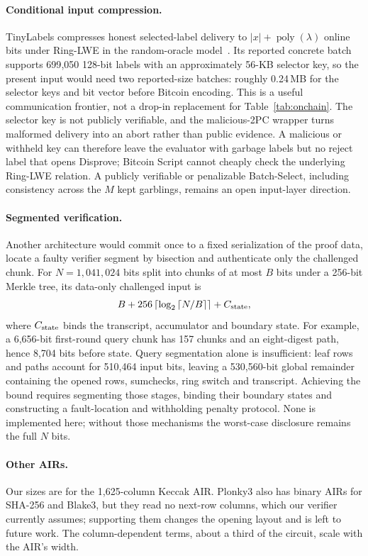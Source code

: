 \documentclass[11pt]{article}
\begin{document}
\paragraph{Conditional input compression.} TinyLabels compresses honest
selected-label delivery to $|x|+\operatorname{poly}(\lambda)$ online bits under
Ring-LWE in the random-oracle model~\cite{tinylabels24}. Its reported concrete
batch supports 699{,}050 128-bit labels with an approximately 56-KB selector
key, so the present input would need two reported-size batches: roughly
0.24\,MB for the selector keys and bit vector before Bitcoin encoding. This is
a useful communication frontier, not a drop-in replacement for Table~\ref{tab:onchain}.
The selector key is not publicly verifiable, and the malicious-2PC wrapper
turns malformed delivery into an abort rather than public evidence. A malicious
or withheld key can therefore leave the evaluator with garbage labels but no
reject label that opens \textsf{Disprove}; Bitcoin Script cannot cheaply check
the underlying Ring-LWE relation. A publicly verifiable or penalizable
Batch-Select, including consistency across the $M$ kept garblings, remains an
open input-layer direction.

\paragraph{Segmented verification.} Another architecture would commit once to
a fixed serialization of the proof data, locate a faulty verifier segment by
bisection and authenticate only the challenged chunk. For $N=1{,}041{,}024$
bits split into chunks of at most $B$ bits under a 256-bit Merkle tree, its
data-only challenged input is
\[
 B+256\left\lceil\log_2\left\lceil N/B\right\rceil\right\rceil+C_{\rm state},
\]
where $C_{\rm state}$ binds the transcript, accumulator and boundary state.
For example, a 6{,}656-bit first-round query chunk has 157 chunks and an
eight-digest path, hence 8{,}704 bits before state. Query segmentation alone is
insufficient: leaf rows and paths account for 510{,}464 input bits, leaving a
530{,}560-bit global remainder containing the opened rows, sumchecks, ring
switch and transcript. Achieving the bound requires segmenting those stages,
binding their boundary states and constructing a fault-location and withholding
penalty protocol. None is implemented here; without those mechanisms the
worst-case disclosure remains the full $N$ bits.

\paragraph{Other AIRs.} Our sizes are for the 1{,}625-column Keccak AIR. Plonky3
also has binary AIRs for SHA-256 and Blake3, but they read no next-row columns,
which our verifier currently assumes; supporting them changes the opening layout
and is left to future work. The column-dependent terms, about a third of the
circuit, scale with the AIR's width.
\end{document}
